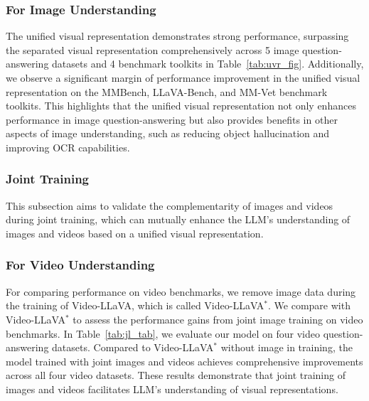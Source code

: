 \subsubsection{For Image Understanding} The unified visual representation demonstrates strong performance, surpassing the separated visual representation comprehensively across 5 image question-answering datasets and 4 benchmark toolkits in Table~\ref{tab:uvr_fig}. Additionally, we observe a significant margin of performance improvement in the unified visual representation on the MMBench, LLaVA-Bench, and MM-Vet benchmark toolkits. This highlights that the unified visual representation not only enhances performance in image question-answering but also provides benefits in other aspects of image understanding, such as reducing object hallucination and improving OCR capabilities.

\subsubsection{Joint Training}
This subsection aims to validate the complementarity of images and videos during joint training, which can mutually enhance the LLM's understanding of images and videos based on a unified visual representation. 

\subsubsection{For Video Understanding} For comparing performance on video benchmarks, we remove image data during the training of Video-LLaVA, which is called Video-LLaVA$^*$. We compare with Video-LLaVA$^*$ to assess the performance gains from joint image training on video benchmarks. In Table~\ref{tab:jl_tab}, we evaluate our model on four video question-answering datasets. Compared to Video-LLaVA$^*$ without image in training, the model trained with joint images and videos achieves comprehensive improvements across all four video datasets. These results demonstrate that joint training of images and videos facilitates LLM's understanding of visual representations.

